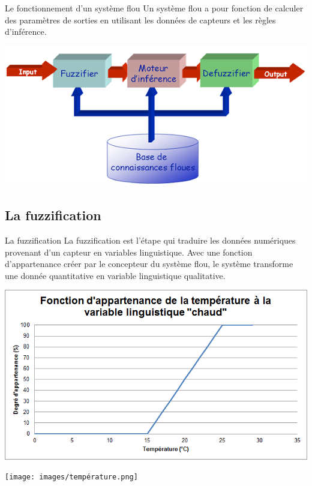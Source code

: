 \documentclass[aspectratio=169,professionalfonts, 12pt]{beamer}
\begin{document}
\begin{frame}{Le fonctionnement d’un système flou}
  Un système flou a pour fonction de calculer des paramètres de sorties
  en utilisant les données de capteurs et les règles d’inférence.
  \begin{center}
    \includegraphics[height=0.4\textwidth]{images/fonctionnement.png}
  \end{center}
\end{frame}


\subsection{La fuzzification}

\begin{frame}{La fuzzification}
  La fuzzification est l'étape qui traduire les données numériques provenant
  d’un capteur en variables linguistique. Avec une fonction d’appartenance
  créer par le concepteur du système flou, le système transforme une donnée
  quantitative en variable linguistique qualitative.
\end{frame}
\begin{frame}
  \begin{center}
    \includegraphics[height=0.4\textwidth]{images/chaud.png}
  \end{center}
\end{frame}

\begin{frame}
  \begin{center}
    \texttt{[image: images/température.png]}
  \end{center}
\end{frame}
\end{document}
